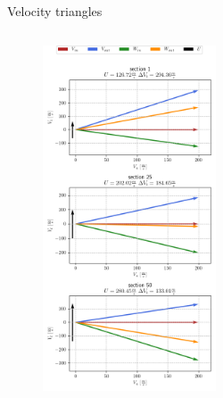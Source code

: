 	{\nologo
	\begin{frame}{Velocity triangles}
		\begin{columns}
				\begin{figure}
					\centering
					\includegraphics[width=0.6\textwidth]{figures/rotorVelocityTriangle.png}
				\end{figure}
				\begin{figure}
					\centering

\end{figure}
\end{columns}
\end{frame}}
